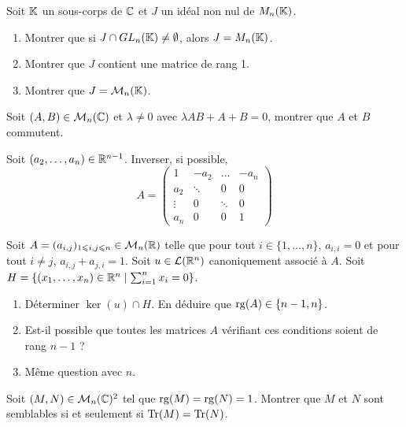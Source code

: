 \begin{exercise}
	Soit $\mathbb{K}$ un sous-corps de $\mathbb{C}$ et $J$ un idéal non nul de $M_{n}(\mathbb{K})$.
	\begin{enumerate}
		\item
		Montrer que si $J\cap GL_{n}(\mathbb{K})\neq\emptyset$, alors $J=M_{n}(\mathbb{K})$.
		\item
		Montrer que $J$ contient une matrice de rang 1.
		\item
		Montrer que $J=\mathcal{M}_{n}(\mathbb{K})$.
	\end{enumerate}
\end{exercise}

\begin{exercise}
	Soit $(A,B)\in\mathcal{M}_{n}(\mathbb{C})$ et $\lambda\neq 0$ avec $\lambda AB+A+B=0$, montrer
	que $A$ et $B$ commutent.
\end{exercise}

\begin{exercise}
	Soit $(a_{2},\dots,a_{n})\in\mathbb{R}^{n-1}$. Inverser, si possible,
	$$
	A=
	\begin{pmatrix}
		1 		& -a_{2}	& \dots		& -a_{n}\\
		a_{2} 	& \ddots 	& 0			& 0\\
		\vdots 	& 0			& \ddots 	& 0\\
		a_{n}	& 0			& 0			& 1
	\end{pmatrix}
	$$
\end{exercise}

\begin{exercise}
	Soit $A=(a_{i,j})_{1\leqslant i,j\leqslant n}\in\mathcal{M}_{n}(\mathbb{R})$ telle que pour
	tout $i\in\{1,\dots,n\}$, $a_{i,i}=0$ et pour tout $i\neq j$,
	$a_{i,j}+a_{j,i}=1$. Soit $u\in\mathcal{L}(\mathbb{R}^{n})$ canoniquement associé à $A$. Soit
	$H=\{(x_{1},\dots,x_{n})\in\mathbb{R}^{n}\mid\sum_{i=1}^{n}x_{i}=0\}$.
	\begin{enumerate}
		\item
		Déterminer $\ker(u)\cap H$. En déduire que $\operatorname{rg}(A)\in\{n-1,n\}$.
		\item
		Est-il possible que toutes les matrices $A$ vérifiant ces conditions
		soient de rang $n-1$ ?
		\item
		Même question avec $n$.
	\end{enumerate}
\end{exercise}

\begin{exercise}
	Soit $(M,N)\in\mathcal{M}_{n}(\mathbb{C})^{2}$ tel que $\operatorname{rg}(M)=\operatorname{rg}(N)=1$. Montrer que $M$ et
	$N$ sont semblables si et seulement si $\operatorname{Tr}(M)=\operatorname{Tr}(N)$.
\end{exercise}

